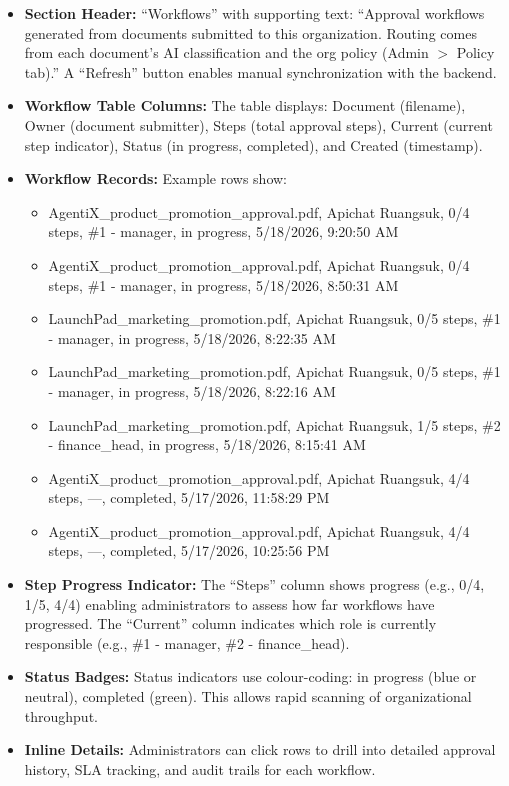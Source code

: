\documentclass[12pt,oneside,openright,a4paper]{cpe-english-project}
\begin{document}
\begin{itemize}
\item \textbf{Section Header:} ``Workflows'' with supporting text: ``Approval workflows generated from documents submitted to this organization. Routing comes from each document's AI classification and the org policy (Admin $>$ Policy tab).'' A ``Refresh'' button enables manual synchronization with the backend.

\item \textbf{Workflow Table Columns:} The table displays: Document (filename), Owner (document submitter), Steps (total approval steps), Current (current step indicator), Status (in progress, completed), and Created (timestamp).

\item \textbf{Workflow Records:} Example rows show:
  \begin{itemize}
  \item AgentiX\_product\_promotion\_approval.pdf, Apichat Ruangsuk, 0/4 steps, \#1 - manager, in progress, 5/18/2026, 9:20:50 AM
  \item AgentiX\_product\_promotion\_approval.pdf, Apichat Ruangsuk, 0/4 steps, \#1 - manager, in progress, 5/18/2026, 8:50:31 AM
  \item LaunchPad\_marketing\_promotion.pdf, Apichat Ruangsuk, 0/5 steps, \#1 - manager, in progress, 5/18/2026, 8:22:35 AM
  \item LaunchPad\_marketing\_promotion.pdf, Apichat Ruangsuk, 0/5 steps, \#1 - manager, in progress, 5/18/2026, 8:22:16 AM
  \item LaunchPad\_marketing\_promotion.pdf, Apichat Ruangsuk, 1/5 steps, \#2 - finance\_head, in progress, 5/18/2026, 8:15:41 AM
  \item AgentiX\_product\_promotion\_approval.pdf, Apichat Ruangsuk, 4/4 steps, —, completed, 5/17/2026, 11:58:29 PM
  \item AgentiX\_product\_promotion\_approval.pdf, Apichat Ruangsuk, 4/4 steps, —, completed, 5/17/2026, 10:25:56 PM
  \end{itemize}

\item \textbf{Step Progress Indicator:} The ``Steps'' column shows progress (e.g., 0/4, 1/5, 4/4) enabling administrators to assess how far workflows have progressed. The ``Current'' column indicates which role is currently responsible (e.g., \#1 - manager, \#2 - finance\_head).

\item \textbf{Status Badges:} Status indicators use colour-coding: in progress (blue or neutral), completed (green). This allows rapid scanning of organizational throughput.

\item \textbf{Inline Details:} Administrators can click rows to drill into detailed approval history, SLA tracking, and audit trails for each workflow.
\end{itemize}
\end{document}

